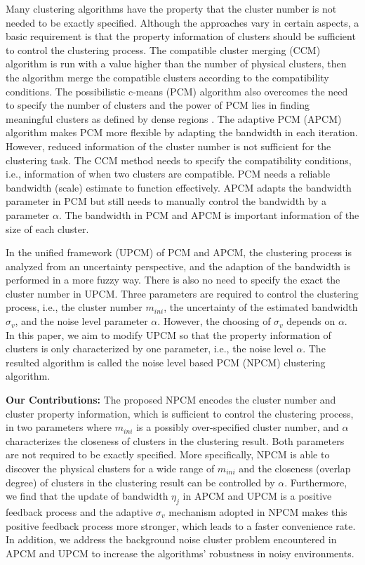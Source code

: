 \documentclass[conference]{IEEEtran}
\theoremstyle{definition}
\begin{document}
Many clustering algorithms have the property that the cluster number is not needed to be exactly specified.
Although the approaches vary in certain aspects, a basic requirement is that the property information of clusters should be sufficient to control the clustering process.
The compatible cluster merging (CCM) algorithm \cite{krishnapuram_fitting_1992} is run with a value higher than the number of physical clusters, then the algorithm merge the compatible clusters according to the compatibility conditions. The possibilistic c-means (PCM) \cite{krishnapuram_possibilistic_1993} algorithm also overcomes the need to specify the number of clusters and the power of PCM lies in finding meaningful clusters as defined by dense regions \cite{krishnapuram_possibilistic_1996}. The adaptive PCM (APCM) \cite{xenaki_novel_2016} algorithm makes PCM more flexible by adapting the bandwidth in each iteration. However, reduced information of the cluster number is not sufficient for the clustering task. The CCM method needs to specify the compatibility conditions, i.e., information of when two clusters are compatible. PCM needs a reliable bandwidth (scale) estimate to function effectively. APCM adapts the bandwidth parameter in PCM but still needs to manually control the bandwidth by a parameter $\alpha$. The bandwidth in PCM and APCM is important information of the size of each cluster.

In the unified framework (UPCM) \cite{hou_pcm_2016} of PCM and APCM, the clustering process is analyzed from an uncertainty perspective, and the adaption of the bandwidth is performed in a more fuzzy way. There is also no need to specify the exact the cluster number in UPCM. Three parameters are required to control the clustering process, i.e., the cluster number $m_{ini}$, the uncertainty of the estimated bandwidth $\sigma_v$, and the noise level parameter $\alpha$. However, the choosing of $\sigma_v$ depends on $\alpha$. In this paper, we aim to modify UPCM so that the property information of clusters is only characterized by one parameter, i.e., the noise level $\alpha$.
The resulted algorithm is called the noise level based PCM (NPCM) clustering algorithm.

\textbf{Our Contributions:}
The proposed NPCM encodes the cluster number and cluster property information, which is sufficient to control the clustering process, in two parameters where $m_{ini}$ is a possibly over-specified cluster number, and $\alpha$ characterizes the closeness of clusters in the clustering result.
Both parameters are not required to be exactly specified. More specifically, NPCM is able to discover the physical clusters for a wide range of $m_{ini}$ and the closeness (overlap degree) of clusters in the clustering result can be controlled by $\alpha$.
Furthermore, we find that the update of bandwidth $\eta_j$ in APCM and UPCM is a positive feedback process and the adaptive $\sigma_v$ mechanism adopted in NPCM makes this positive feedback process more stronger, which leads to a faster convenience rate.
In addition, we address the background noise cluster problem encountered in APCM and UPCM to increase the algorithms' robustness in noisy environments.
\end{document}
